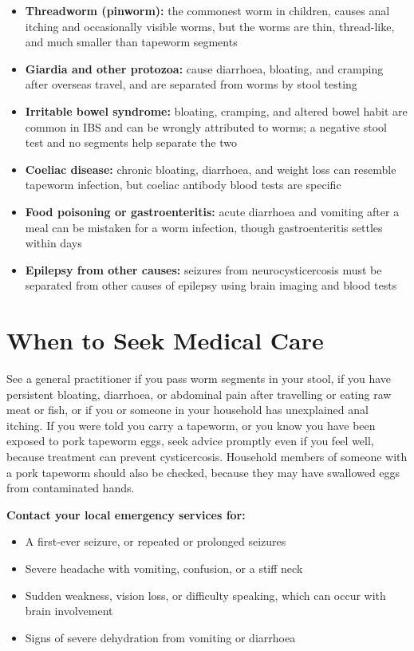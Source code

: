 \begin{itemize}
    \item \textbf{Threadworm (pinworm):} the commonest worm in children, causes anal itching and occasionally visible worms, but the worms are thin, thread-like, and much smaller than tapeworm segments
    \item \textbf{Giardia and other protozoa:} cause diarrhoea, bloating, and cramping after overseas travel, and are separated from worms by stool testing
    \item \textbf{Irritable bowel syndrome:} bloating, cramping, and altered bowel habit are common in IBS and can be wrongly attributed to worms; a negative stool test and no segments help separate the two
    \item \textbf{Coeliac disease:} chronic bloating, diarrhoea, and weight loss can resemble tapeworm infection, but coeliac antibody blood tests are specific
    \item \textbf{Food poisoning or gastroenteritis:} acute diarrhoea and vomiting after a meal can be mistaken for a worm infection, though gastroenteritis settles within days
    \item \textbf{Epilepsy from other causes:} seizures from neurocysticercosis must be separated from other causes of epilepsy using brain imaging and blood tests
\end{itemize}

\section*{When to Seek Medical Care}
See a general practitioner if you pass worm segments in your stool, if you have persistent bloating, diarrhoea, or abdominal pain after travelling or eating raw meat or fish, or if you or someone in your household has unexplained anal itching. If you were told you carry a tapeworm, or you know you have been exposed to pork tapeworm eggs, seek advice promptly even if you feel well, because treatment can prevent cysticercosis. Household members of someone with a pork tapeworm should also be checked, because they may have swallowed eggs from contaminated hands.

\textbf{Contact your local emergency services for:}
\begin{itemize}
    \item A first-ever seizure, or repeated or prolonged seizures
    \item Severe headache with vomiting, confusion, or a stiff neck
    \item Sudden weakness, vision loss, or difficulty speaking, which can occur with brain involvement
    \item Signs of severe dehydration from vomiting or diarrhoea
\end{itemize}

